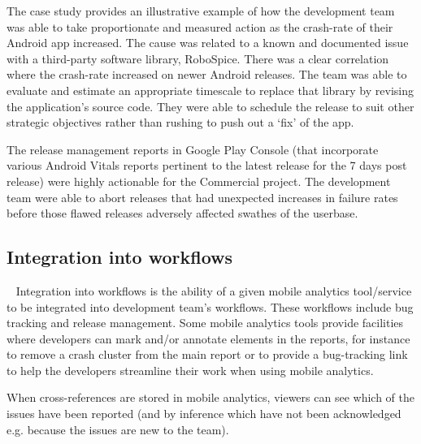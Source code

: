 The  case study provides an illustrative example of how the development team was able to take proportionate and measured action as the crash-rate of their Android app increased. The cause was related to a known and documented issue with a third-party software library, RoboSpice. There was a clear correlation where the crash-rate increased on newer Android releases. The team was able to evaluate and estimate an appropriate timescale to replace that library by revising the application's source code. They were able to schedule the release to suit other strategic objectives rather than rushing to push out a `fix' of the app.

The release management reports in Google Play Console (that incorporate various Android Vitals reports pertinent to the latest release for the 7 days post release) were highly actionable for the Commercial project. The development team were able to abort releases that had unexpected increases in failure rates before those flawed releases adversely affected swathes of the userbase.

\subsection{Integration into workflows}~\label{tata-integration-into-workflows-topic}
Integration into workflows is the ability of a given mobile analytics tool/service to be integrated into development team's workflows. These workflows include bug tracking and release management. Some mobile analytics tools provide facilities where developers can mark and/or annotate elements in the reports, for instance to remove a crash cluster from the main report or to provide a bug-tracking link to help the developers streamline their work when using mobile analytics.

When cross-references are stored in mobile analytics, viewers can see which of the issues have been reported (and by inference which have not been acknowledged e.g. because the issues are new to the team).

